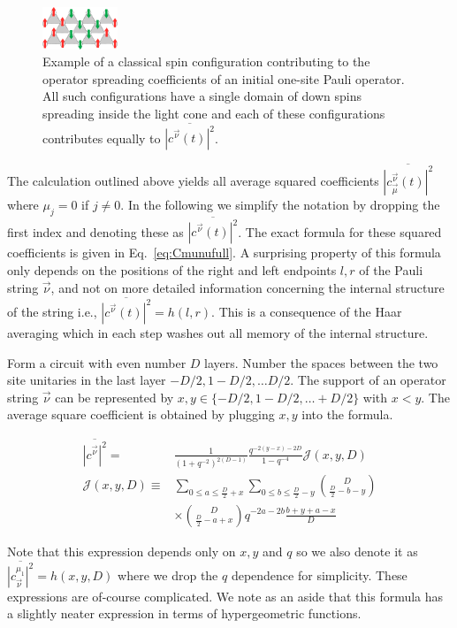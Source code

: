 \documentclass[aps,prb,twocolumn,superscriptaddress]{revtex4-1}
\begin{document}
 \begin{figure}[h!]
 \centering
  	\includegraphics[width=0.2\textwidth]{one_domain_example.pdf} 
\caption{Example of a classical spin configuration contributing to the operator spreading coefficients of an initial one-site Pauli operator. All such configurations have a single domain of down spins spreading inside the light cone and each of these configurations contributes equally to $\overline{|c^{\vec{\nu}}(t)|^{2}}$.}
 \label{fig:domain_spread}
 \end{figure}

The calculation outlined above yields all average squared coefficients $\overline{|c_{\vec{\mu}}^{\vec{\nu}}(t)|^{2}}$ where $\mu_j = 0$ if $j\neq 0$. In the following we simplify the notation by dropping the first index and denoting these as $\overline{|c^{\vec{\nu}}(t)|^{2}}$. The exact formula for these squared coefficients is given in Eq.~\eqref{eq:Cmunufull}. A surprising property of this formula only depends on the positions of the right and left endpoints $l,r$ of the Pauli string $\vec{\nu}$, and not on more detailed information concerning the internal structure of the string i.e., $\overline{|c^{\vec{\nu}}(t)|^{2}}=h(l,r)$. This is a consequence of the Haar averaging which in each step washes out all memory of the internal structure.

Form a circuit with even number $D$ layers. Number the spaces between
the two site unitaries in the last layer $-D/2,1-D/2,\ldots D/2$.
The support of an operator string $\vec{\nu}$ can be represented
by $x,y\in\{ -D/2,1-D/2,\ldots+D/2\} $ with $x<y$. The
average square coefficient is obtained by plugging $x,y$ into the
formula.

\begin{align}
\overline{|c^{\vec{\nu}}|^{2}}  =& \frac{1}{(1+q^{-2})^{2(D-1)}} \frac{q^{-2(y-x)-2D}}{1-q^{-4}} \mathcal{J}(x,y,D)\nonumber \\
\mathcal{J}(x,y,D) \equiv& \sum_{0\leq a\leq\frac{D}{2}+x} \sum_{0\leq b\leq\frac{D}{2}-y}\binom{D}{\frac{D}{2}-b-y}\nonumber\\
&\times \binom{D}{\frac{D}{2}-a+x} q^{-2a-2b}\frac{b+y+a-x}{D}
\label{eq:Cmunufull}
\end{align}


Note that this expression depends only on $x,y$ and $q$ so we also
denote it as $\overline{|c_{\vec{\nu}}^{\mu_{1}}|^{2}}=h(x,y,D)$
where we drop the $q$ dependence for simplicity. These expressions
are of-course complicated. We note as an aside that this formula has
a slightly neater expression in terms of hypergeometric functions.
\end{document}
